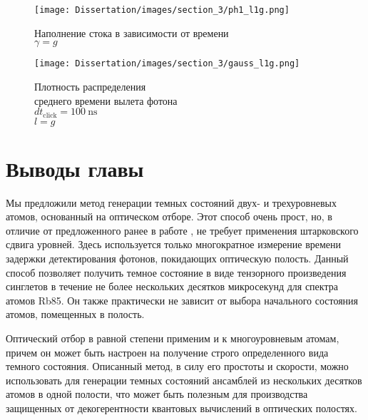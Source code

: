 \begin{figure}[ht!]
	\texttt{[image: Dissertation/images/section\_3/ph1\_l1g.png]}
	\captionsetup{format=hang,width=0.8\textwidth,justification=centering,singlelinecheck=no}
	\caption{
		Наполнение стока  в зависимости от времени\\ 
		$\gamma = g$
	}
	\label{fig:csignga}
\end{figure}

\begin{figure}[ht!]
	\noindent\centering\texttt{[image: Dissertation/images/section\_3/gauss\_l1g.png]}
	\captionsetup{format=hang,width=0.8\textwidth,justification=centering,singlelinecheck=no}
	\caption{
		Плотность распределения\\среднего времени вылета фотона\\
		$dt_{\text{click}}= 100~\text{ns}$\\
		$l = g$
	}
	\label{fig:csignga1}
\end{figure}

\clearpage
\section{Выводы главы}\label{sec:ch3/sect5}
Мы предложили метод генерации темных состояний двух- и трехуровневых атомов, основанный на оптическом отборе. Этот способ очень прост, но, в отличие от предложенного ранее в работе \cite{tanamoto}, не требует применения штарковского сдвига уровней. Здесь используется только многократное измерение времени задержки детектирования фотонов, покидающих оптическую полость. Данный способ позволяет получить темное состояние в виде тензорного произведения синглетов в течение не более нескольких десятков микросекунд для спектра атомов Rb85. Он также практически не зависит от выбора начального состояния атомов, помещенных в полость.

Оптический отбор в равной степени применим и к многоуровневым атомам, причем он может быть настроен на получение строго определенного вида темного состояния. Описанный метод, в силу его простоты и скорости, можно использовать для генерации темных состояний ансамблей из нескольких десятков атомов в одной полости, что может быть полезным для производства защищенных от декогерентности квантовых вычислений в оптических
полостях.
